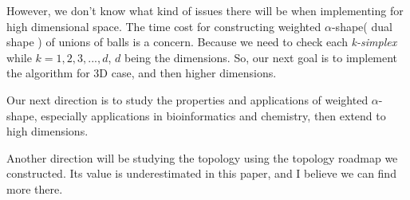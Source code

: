 \documentclass[11pt]{article}
\begin{document}
\indent However, we don't know what kind of issues there will be when implementing for high dimensional space. The time cost for constructing weighted $\alpha$-shape( dual shape ) of unions of balls is a concern. Because we need to check each \emph{k-simplex} while $k = 1, 2, 3, ..., d$, $d$ being the dimensions. So, our next goal is to implement the algorithm for 3D case, and then higher dimensions.

\indent Our next direction is to study the properties and applications of weighted $\alpha$-shape, especially applications in bioinformatics and chemistry, then extend to high dimensions.

\indent Another direction will be studying the topology using the topology roadmap we constructed. Its value is underestimated in this paper, and I believe we can find more there.
\end{document}
